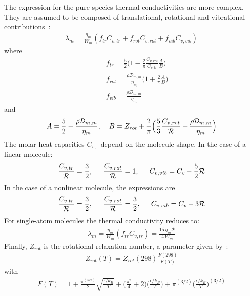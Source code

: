 The expression for the pure species thermal conductivities are more complex. They are assumed to be composed of translational, rotational and vibrational contributions~\cite{Warnatz:}:
\begin{eqnarray*}
\lambda_m = \frac{\eta_m}{W_m} (f_{tr}C_{v,tr} + f_{rot}C_{v,rot} + f_{vib}C_{v,vib})
\end{eqnarray*}
where
\begin{eqnarray*}
&&f_{tr} = \frac{5}{2}\Big(1-\frac{2}{\pi} \frac{C_{v,rot}}{C_{v,tr}} \frac{A}{B} \Big)
\\
&&f_{rot} = \frac{\rho \mathcal{D}_{m,m}}{\eta_m} \Big( 1 + \frac{2}{\pi} \frac{A}{B}  \Big)
 \\
&&f_{vib} = \frac{\rho \mathcal{D}_{m,m}}{\eta_m}
\end{eqnarray*}
and
\begin{eqnarray*}
A = \frac{5}{2} - \frac{\rho \mathcal{D}_{m,m}}{\eta_m},
\hspace{4mm}
B = Z_{rot} + \frac{2}{\pi} \Big( \frac{5}{3} \frac{C_{v,rot}}{\mathcal{R}} + \frac{\rho \mathcal{D}_{m,m}}{\eta_m} \Big)
\end{eqnarray*}
The molar heat capacities $C_{v,\cdot}$ depend on the molecule shape. In the case of a linear molecule:
\begin{eqnarray*}
\frac{C_{v,tr}}{\mathcal{R}} = \frac{3}{2},
\hspace{1.5em}
\frac{C_{v,rot}}{\mathcal{R}} = 1,
\hspace{1.5em} 
{C_{v,vib}} = C_v - \frac{5}{2} \mathcal{R}
\end{eqnarray*}
In the case of a nonlinear molecule, the expressions are
\begin{eqnarray*}
\frac{C_{v,tr}}{\mathcal{R}} = \frac{3}{2},
\hspace{1.5em} 
\frac{C_{v,rot}}{\mathcal{R}} =  \frac{3}{2},
\hspace{1.5em} 
{C_{v,vib}} = C_v - 3 \mathcal{R}
\end{eqnarray*}
For single-atom molecules the thermal conductivity reduces to:
\begin{eqnarray*}
\lambda_m = \frac{\eta_m}{W_m} (f_{tr}C_{v,tr} ) = \frac{15 \, \eta_m \mathcal{R}}{4 \, W_m}
\end{eqnarray*}
Finally, $Z_{rot}$ is the rotational relaxation number, a parameter given by~\cite{Parker:}:
\begin{eqnarray*}
Z_{rot}(T) = Z_{rot} (298) \frac{F(298)}{F(T)}
\end{eqnarray*}
with 
\begin{eqnarray*}
F(T) = 1 + \frac{\pi^{(3/2)}}{2} \sqrt{\frac{\epsilon/k_B}{T} } + \Big( \frac{\pi^2}{4} +2 \Big) \Big( \frac{\epsilon/k_B}{T} \Big) + \pi^{(3/2)}\Big( \frac{\epsilon/k_B}{T} \Big)^{(3/2)} 
\end{eqnarray*}

